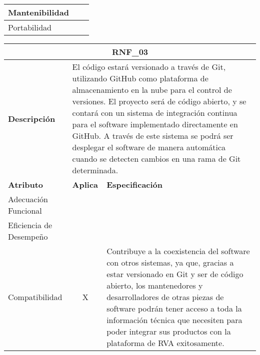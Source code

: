 \begin{center}
\begin{tabular}{ | p{2cm}| p{8cm} | p{5cm} |}
    \multicolumn{1}{|p{3.5cm}|}{\nohyphens{Mantenibilidad}} & \multicolumn{1}{|c|}{} & \multicolumn{1}{|p{10cm}|}{} \\ \hline
    
    \multicolumn{1}{|p{3.5cm}|}{\nohyphens{Portabilidad}} & \multicolumn{1}{|c|}{} & \multicolumn{1}{|p{10cm}|}{} \\
    
    \hline
  \end{tabular}
\end{center}

\begin{center}
  \begin{tabular}{ | p{2cm}| p{8cm} | p{5cm} |}
    \hline
    \multicolumn{3}{|c|}{\textbf{RNF\_03}} \\
    \hline
    
    \multicolumn{1}{|p{2cm}|}{\textbf{Descripción}} & \multicolumn{2}{|p{13cm}|}{El código estará versionado a través de Git, utilizando GitHub como plataforma de almacenamiento en la nube para el control de versiones. El proyecto será de código abierto, y se contará con un sistema de integración continua para el software implementado directamente en GitHub. A través de este sistema se podrá ser desplegar el software de manera automática cuando se detecten cambios en una rama de Git determinada.} \\ \hline
    
    \multicolumn{1}{|p{3.5cm}|}{\textbf{{Atributo}}} & \multicolumn{1}{|p{1.5cm}|}{\textbf{Aplica}} & \multicolumn{1}{|p{10cm}|}{\textbf{Especificación}} \\ \hline
    
    \multicolumn{1}{|p{3.5cm}|}{\nohyphens{Adecuación Funcional}} & \multicolumn{1}{|c|}{} & \multicolumn{1}{|p{10cm}|}{} \\ \hline
    
    \multicolumn{1}{|p{3.5cm}|}{\nohyphens{Eficiencia de Desempeño}} & \multicolumn{1}{|c|}{} & \multicolumn{1}{|p{10cm}|}{} \\ \hline
    
    \multicolumn{1}{|p{3.5cm}|}{\nohyphens{Compatibilidad}} & \multicolumn{1}{|c|}{X} & \multicolumn{1}{|p{10cm}|}{Contribuye a la coexistencia del software con otros sistemas, ya que, gracias a estar versionado en Git y ser de código abierto, los mantenedores y desarrolladores de otras piezas de software podrán tener acceso a toda la información técnica que necesiten para poder integrar sus productos con la plataforma de RVA exitosamente.} \\ \hline
    

\end{tabular}
\end{center}
